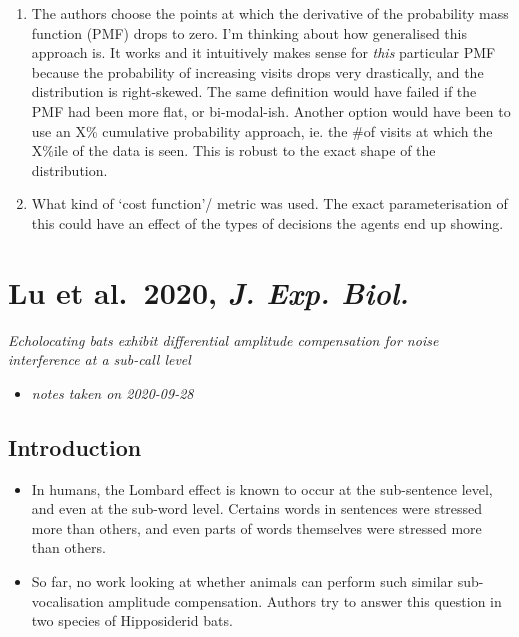 \documentclass[
]{book}
\providecommand{\tightlist}{%
  \setlength{\itemsep}{0pt}\setlength{\parskip}{0pt}}
\begin{document}
\begin{enumerate}
\item
  The authors choose the points at which the derivative of the probability mass function (PMF) drops to zero. I'm thinking about how generalised this approach is. It works and it intuitively makes sense for \emph{this} particular PMF because the probability of increasing visits drops very drastically, and the distribution is right-skewed. The same definition would have failed if the PMF had been more flat, or bi-modal-ish. Another option would have been to use an X\% cumulative probability approach, ie. the \#of visits at which the X\%ile of the data is seen. This is robust to the exact shape of the distribution.
\item
  What kind of `cost function'/ metric was used. The exact parameterisation of this could have an effect of the types of decisions the agents end up showing.
\end{enumerate}

\hypertarget{lu-et-al.-2020-j.-exp.-biol.}{%
\chapter{\texorpdfstring{Lu et al.~2020, \emph{J. Exp. Biol.}}{Lu et al.~2020, J. Exp. Biol.}}\label{lu-et-al.-2020-j.-exp.-biol.}}


\emph{Echolocating bats exhibit differential amplitude compensation for noise interference at a sub-call level} \citep{lu2020echolocating}

\begin{itemize}
\tightlist
\item
  \emph{notes taken on 2020-09-28}
\end{itemize}

\hypertarget{introduction-12}{%
\section{Introduction}\label{introduction-12}}

\begin{itemize}
\tightlist
\item
  In humans, the Lombard effect is known to occur at the sub-sentence level, and even at the sub-word level. Certains words in sentences were stressed more than others, and even parts of words themselves were stressed more than others.
\item
  So far, no work looking at whether animals can perform such similar sub-vocalisation amplitude compensation. Authors try to answer this question in two species of Hipposiderid bats.
\end{itemize}
\end{document}
